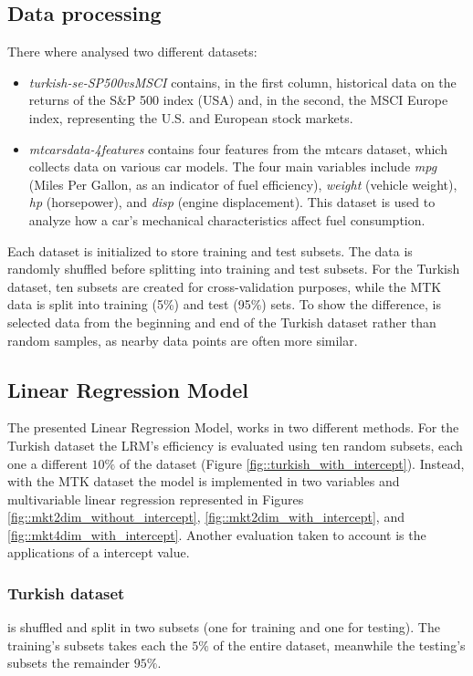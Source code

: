 \documentclass[9pt,technote]{IEEEtran}
\begin{document}
	\subsection{Data processing}
There where analysed two different datasets:
	\begin{itemize}
		\item \textit{turkish-se-SP500vsMSCI} contains, in the first column, historical data on the returns of the S\&P 500 index (USA) and, in the second, the MSCI Europe index, representing the U.S. and European stock markets.
		\item \textit{mtcarsdata-4features} contains four features from the mtcars dataset, which collects data on various car models. The four main variables include \textit{mpg} (Miles Per Gallon, as an indicator of fuel efficiency), \textit{weight} (vehicle weight), \textit{hp} (horsepower), and \textit{disp} (engine displacement). This dataset is used to analyze how a car’s mechanical characteristics affect fuel consumption.
	\end{itemize}
Each dataset is initialized to store training and test subsets. The data is randomly shuffled before splitting into training and test subsets. For the Turkish dataset, ten subsets are created for cross-validation purposes, while the MTK data is split into training (5\%) and test (95\%) sets. To show the difference, is selected data from the beginning and end of the Turkish dataset rather than random samples, as nearby data points are often more similar.
 
	\subsection{Linear Regression Model}
The presented Linear Regression Model, works in two different methods. For the Turkish dataset the LRM's efficiency is evaluated using ten random subsets, each one a different $10\%$ of the dataset (Figure \ref{fig::turkish_with_intercept}). Instead, with the MTK dataset the model is implemented in two variables and multivariable linear regression represented in Figures \ref{fig::mkt2dim_without_intercept}, \ref{fig::mkt2dim_with_intercept}, and \ref{fig::mkt4dim_with_intercept}. Another evaluation taken to account is the applications of a intercept value.
		\subsubsection{Turkish dataset}
		is shuffled and split in two subsets (one for training and one for testing). The training's subsets takes each the $5\%$ of the entire dataset, meanwhile the testing's subsets the remainder $95\%$.
\end{document}
